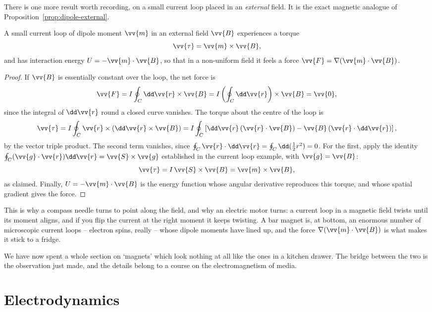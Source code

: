 There is one more result worth recording, on a small current loop placed in an \emph{external} field. It is the exact magnetic analogue of Proposition~\ref{prop:dipole-external}.

\begin{proposition}
	A small current loop of dipole moment $\vv{m}$ in an external field $\vv{B}$ experiences a torque
	$$
	\vv{\tau} = \vv{m}\times\vv{B},
	$$
	and has interaction energy $U = -\vv{m}\cdot\vv{B}$, so that in a non-uniform field it feels a force $\vv{F} = \nabla(\vv{m}\cdot\vv{B})$.
\end{proposition}
\begin{proof}
	If $\vv{B}$ is essentially constant over the loop, the net force is
	$$
	\vv{F} = I\oint_C \dd \vv{r}\times \vv{B} = I\left(\oint_C \dd \vv{r}\right)\times\vv{B} = \vv{0},
	$$
	since the integral of $\dd\vv{r}$ round a closed curve vanishes. The torque about the centre of the loop is
	$$
	\vv{\tau} = I\oint_C \vv{r}\times(\dd \vv{r}\times \vv{B}) = I\oint_C\left[\dd \vv{r}\,(\vv{r}\cdot\vv{B}) - \vv{B}\,(\vv{r}\cdot\dd\vv{r})\right],
	$$
	by the vector triple product. The second term vanishes, since $\oint_C \vv{r}\cdot\dd\vv{r} = \oint_C \dd(\tfrac12 r^2) = 0$. For the first, apply the identity $\oint_C(\vv{g}\cdot\vv{r})\dd\vv{r} = \vv{S}\times\vv{g}$ established in the current loop example, with $\vv{g} = \vv{B}$:
	$$
	\vv{\tau} = I\,\vv{S}\times \vv{B} = \vv{m}\times\vv{B},
	$$
	as claimed. Finally, $U = -\vv{m}\cdot\vv{B}$ is the energy function whose angular derivative reproduces this torque, and whose spatial gradient gives the force.
\end{proof}

This is why a compass needle turns to point along the field, and why an electric motor turns: a current loop in a magnetic field twists until its moment aligns, and if you flip the current at the right moment it keeps twisting. A bar magnet is, at bottom, an enormous number of microscopic current loops -- electron spins, really -- whose dipole moments have lined up, and the force $\nabla(\vv{m}\cdot\vv{B})$ is what makes it stick to a fridge.

We have now spent a whole section on `magnets' which look nothing at all like the ones in a kitchen drawer. The bridge between the two is the observation just made, and the details belong to a course on the electromagnetism of media.

\section{Electrodynamics}


